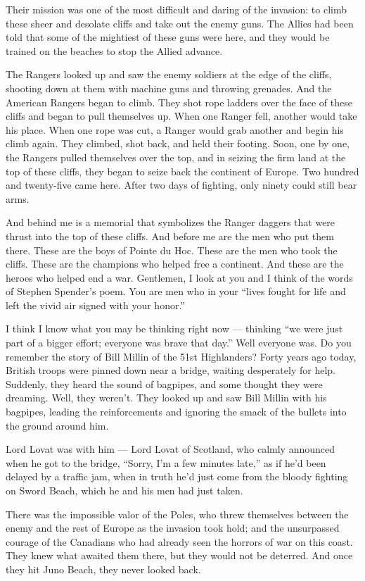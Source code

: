 \documentclass[a4paper]{amsbook}
\begin{document}
Their mission was one of the most difficult and daring of the invasion: to climb these sheer and desolate cliffs and take out the enemy guns. The Allies had been told that some of the mightiest of these guns were here, and they would be trained on the beaches to stop the Allied advance.

The Rangers looked up and saw the enemy soldiers at the edge of the cliffs, shooting down at them with machine guns and throwing grenades. And the American Rangers began to climb. They shot rope ladders over the face of these cliffs and began to pull themselves up. When one Ranger fell, another would take his place. When one rope was cut, a Ranger would grab another and begin his climb again. They climbed, shot back, and held their footing. Soon, one by one, the Rangers pulled themselves over the top, and in seizing the firm land at the top of these cliffs, they began to seize back the continent of Europe. Two hundred and twenty-five came here. After two days of fighting, only ninety could still bear arms.

And behind me is a memorial that symbolizes the Ranger daggers that were thrust into the top of these cliffs. And before me are the men who put them there. These are the boys of Pointe du Hoc. These are the men who took the cliffs. These are the champions who helped free a continent. And these are the heroes who helped end a war. Gentlemen, I look at you and I think of the words of Stephen Spender's poem. You are men who in your “lives fought for life and left the vivid air signed with your honor.”

I think I know what you may be thinking right now — thinking “we were just part of a bigger effort; everyone was brave that day.” Well everyone was. Do you remember the story of Bill Millin of the 51st Highlanders? Forty years ago today, British troops were pinned down near a bridge, waiting desperately for help. Suddenly, they heard the sound of bagpipes, and some thought they were dreaming. Well, they weren't. They looked up and saw Bill Millin with his bagpipes, leading the reinforcements and ignoring the smack of the bullets into the ground around him.

Lord Lovat was with him — Lord Lovat of Scotland, who calmly announced when he got to the bridge, “Sorry, I'm a few minutes late,” as if he'd been delayed by a traffic jam, when in truth he'd just come from the bloody fighting on Sword Beach, which he and his men had just taken.

There was the impossible valor of the Poles, who threw themselves between the enemy and the rest of Europe as the invasion took hold; and the unsurpassed courage of the Canadians who had already seen the horrors of war on this coast. They knew what awaited them there, but they would not be deterred. And once they hit Juno Beach, they never looked back.
\end{document}
